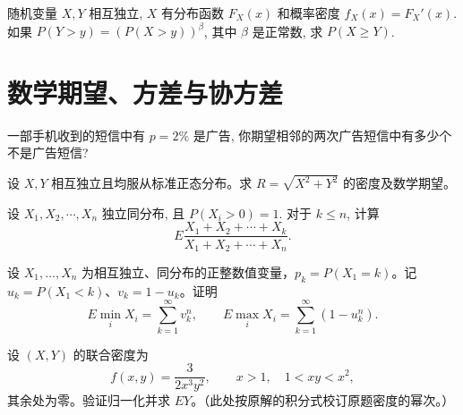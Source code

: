 \begin{exercise}[尾分布幂次与竞争概率]\label{q:A4.32}
随机变量 $X,Y$ 相互独立, $X$ 有分布函数 $F_X(x)$ 和概率密度 $f_X(x)=F_X'(x)$. 如果 $P(Y>y)=(P(X>y))^\beta$, 其中 $\beta$ 是正常数, 求 $P(X\geq Y)$.\par{}\end{exercise}

\clearpage\section{数学期望、方差与协方差}

\begin{exercise}[广告信息之间的等待]\label{q:A5.5}
一部手机收到的短信中有 $p=2\%$ 是广告, 你期望相邻的两次广告短信中有多少个不是广告短信?\par{}\end{exercise}

\begin{exercise}[标准正态半径的期望]\label{q:A5.8}
设 $X,Y$ 相互独立且均服从标准正态分布。求 $R=\sqrt{X^2+Y^2}$ 的密度及数学期望。\par{}\end{exercise}

\begin{exercise}[交换对称与比例期望]\label{q:A5.9}
设 $X_1,X_2,\cdots,X_n$ 独立同分布, 且 $P(X_i>0)=1$. 对于 $k\leq n$, 计算
    \[E\dfrac{X_1+X_2+\cdots+X_k}{X_1+X_2+\cdots+X_n}.\]\par{}\end{exercise}

\begin{exercise}[离散极值的尾和公式]\label{q:A5.12}
设 $X_1,\ldots,X_n$ 为相互独立、同分布的正整数值变量，$p_k=P(X_1=k)$。记 $u_k=P(X_1<k)$、$v_k=1-u_k$。证明\[E\min_iX_i=\sum_{k=1}^\infty v_k^n,\qquad E\max_iX_i=\sum_{k=1}^\infty(1-u_k^n).\]\par{}\end{exercise}

\begin{exercise}[曲边密度的归一化勘误]\label{q:A5.14}
设 $(X,Y)$ 的联合密度为\[f(x,y)=\frac{3}{2x^3y^2},\qquad x>1,\quad 1<xy<x^2,\]其余处为零。验证归一化并求 $EY$。（此处按原解的积分式校订原题密度的幂次。）\par{}\end{exercise}

